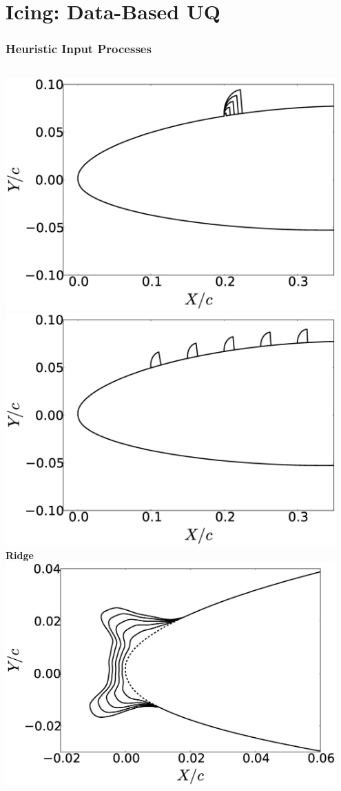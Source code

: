 \documentclass[9pt]{beamer}
\begin{document}
\section{Icing: Data-Based UQ}
\label{sec-3}
\begin{frame}
\frametitle{Heuristic Input Processes}
\label{sec-3-1}


\begin{columns}[c]
    \centering
    \includegraphics[width=0.95\textwidth]{RidgeRVariation} \\
    \includegraphics[width=0.95\textwidth]{RidgeSVariation} \\
    {\bf Ridge}
    \centering
    \includegraphics[width=0.95\textwidth]{HornHVariation} \\

\end{columns}
\end{frame}
\end{document}
